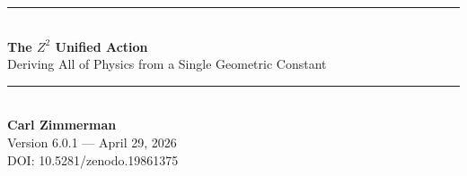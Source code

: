 \documentclass[11pt,a4paper]{article}
\theoremstyle{plain}
\theoremstyle{definition}
\theoremstyle{remark}
\begin{document}

\begin{center}
\rule{\textwidth}{1.5pt}\\[0.5cm]
{\LARGE\bfseries The $Z^2$ Unified Action}\\[0.3cm]
{\Large Deriving All of Physics from a Single Geometric Constant}\\[0.5cm]
\rule{\textwidth}{1.5pt}\\[0.8cm]

{\large\bfseries Carl Zimmerman}\\[0.3cm]
Version 6.0.1 --- April 29, 2026\\[0.3cm]
DOI: 10.5281/zenodo.19861375
\end{center}

\vspace{1cm}

\end{document}
